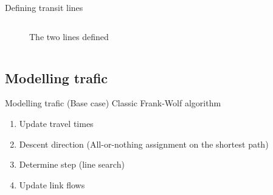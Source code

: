 \documentclass{EESD}
\begin{document}
\begin{frame}{Defining transit lines}
\begin{columns}
\begin{figure}
{			\caption{The two lines defined}
			}
		\end{figure}
	\end{columns}
\end{frame}

\subsection{Modelling trafic}
\begin{frame}{Modelling trafic (Base case)}
	Classic Frank-Wolf algorithm
	\begin{enumerate}
		\item Update travel times
		\item Descent direction (All-or-nothing assignment on the shortest path)
		\item Determine step (line search)
		\item Update link flows
	\end{enumerate}
\end{frame}
\end{document}
